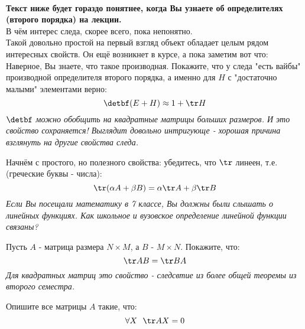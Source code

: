 	\begin{problem} 
		\textbf{\\Текст ниже будет гораздо понятнее, когда Вы узнаете об определителях (второго порядка) на лекции.} \\
		В чём интерес следа, скорее всего, пока непонятно. \\
		Такой довольно простой на первый взгляд объект обладает целым рядом интересных свойств. Он ещё возникнет в курсе, а пока заметим вот что: \\
		Наверное, Вы знаете, что такое производная. Покажите, что у следа "есть вайбы" производной определителя второго порядка, а именно для $H$ с "достаточно малыми" элементами верно:
		$$ \detbf (E + H) \approx 1 + \tr H$$
		\textit{$\detbf$ можно обобщить на квадратные матрицы больших размеров. И это свойство сохраняется! Выглядит довольно интригующе - хорошая причина взглянуть на другие свойства следа.}
	\end{problem}

	\begin{problem}
		Начнём с простого, но полезного свойства: убедитесь, что $\tr$  линеен, т.е. (греческие буквы - числа):
		$$ \tr(\alpha A + \beta B) = \alpha \tr A + \beta \tr B$$
		\textit{Если Вы посещали математику в 7 классе, Вы должны были слышать о линейных функциях. Как школьное и вузовское определение линейной функции связаны?}
	\end{problem}

	\begin{problem}
		Пусть $A$ - матрица размера $N \times M$, а $B$ - $M \times N$. Покажите, что:
		$$\tr AB = \tr BA$$
		\textit{Для квадратных матриц это свойство - следсвтие из более общей теоремы из второго семестра.}
	\end{problem}
	
	\begin{problem} [Г7.12]
		Опишите все матрицы $A$ такие, что:
		$$ \forall X \ \ \tr AX = 0 $$
	\end{problem}

